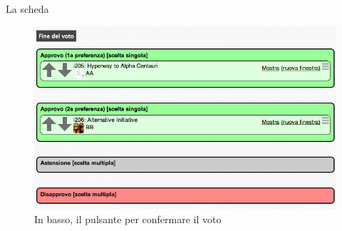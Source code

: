 \begin{frame}{La scheda}
\begin{figure}\includegraphics[width=.9\textwidth]{pics/scheda}
\caption{In basso, il pulsante per confermare il voto}
\end{figure}
\end{frame}

